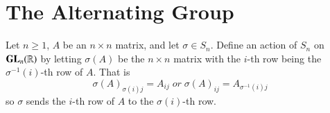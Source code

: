 \documentclass[12pt, a4paper, oneside, openright, titlepage]{book}
\begin{document}
\section{\textsection The Alternating Group}

\begin{defn}
        Let $n \geq 1$, $A$ be an $n\times n$ matrix, and let $\sigma \in S_n$. Define an action of $S_n$ on $\mathbf{GL}_n(\mathbb R)$ by letting $\sigma(A)$ be the $n \times n$ matrix with the $i$-th row being the $\sigma^{-1}(i)$-th row of $A$. That is \begin{equation}
                \sigma(A)_{\sigma(i)j} = A_{ij} \;or\;\sigma(A)_{ij} = A_{\sigma^{-1}(i)j}
        \end{equation}
        so $\sigma$ sends the $i$-th row of $A$ to the $\sigma(i)$-th row.
\end{defn}
\end{document}
